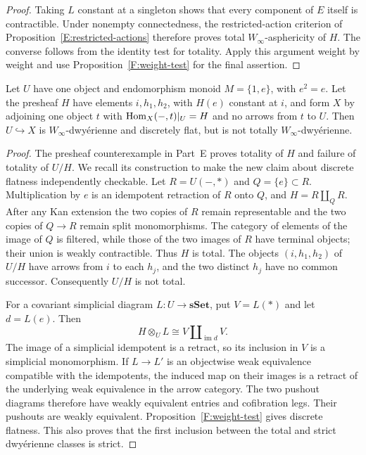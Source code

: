 \begin{proof}
Taking $L$ constant at a singleton shows that every
component of $E$ itself is contractible. Under
nonempty connectedness, the restricted-action
criterion of Proposition~\ref{E:restricted-actions}
therefore proves total $W_\infty$-asphericity of $H$.
The converse follows from the identity test for
totality. Apply this argument weight by weight and
use Proposition~\ref{F:weight-test} for the final
assertion.
\end{proof}

\begin{example}\label{F:strict-not-total}
Let $U$ have one object and endomorphism monoid
$M=\{1,e\}$, with $e^2=e$. Let the presheaf
$H$ have elements $i,h_1,h_2$, with $H(e)$
constant at $i$, and form $X$ by adjoining one
object $t$ with $\operatorname{Hom}_X(-,t)|_U=H$ and no
arrows from $t$ to $U$. Then $U\hookrightarrow X$
is $W_\infty$-dwy\'erienne and discretely flat,
but is not totally $W_\infty$-dwy\'erienne.
\end{example}

\begin{proof}
The presheaf counterexample in Part~E proves
totality of $H$ and failure of totality of $U/H$.
We recall its construction to make the new claim
about discrete flatness independently checkable.
Let $R=U(-,*)$ and $Q=\{e\}\subset R$.
Multiplication by $e$ is an idempotent retraction
of $R$ onto $Q$, and
$H=R\amalg_QR$. After any Kan extension the
two copies of $R$ remain representable and
the two copies of $Q\to R$ remain split
monomorphisms. The category of elements of the
image of $Q$ is filtered, while those of the
two images of $R$ have terminal objects; their
union is weakly contractible. Thus $H$ is total.
The objects $(i,h_1,h_2)$ of $U/H$ have
arrows from $i$ to each $h_j$, and the two
distinct $h_j$ have no common successor.
Consequently $U/H$ is not total.

For a covariant simplicial diagram $L:U\to
\mathbf{sSet}$, put $V=L(*)$ and let $d=L(e)$.
Then
\[
 H\otimes_U L\cong V\amalg_{\operatorname{im}d}V.
\]
The image of a simplicial idempotent is a
retract, so its inclusion in $V$ is a
simplicial monomorphism. If $L\to L'$ is
an objectwise weak equivalence compatible
with the idempotents, the induced map on
their images is a retract of the underlying
weak equivalence in the arrow category.
The two pushout diagrams therefore have
weakly equivalent entries and cofibration
legs. Their pushouts are weakly equivalent.
Proposition~\ref{F:weight-test} gives discrete
flatness. This also proves that the first
inclusion between the total and strict
dwy\'erienne classes is strict.
\end{proof}

